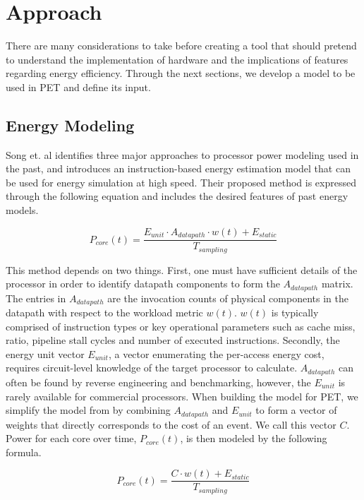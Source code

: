 \section{Approach}

There are many considerations to take before creating a tool that should pretend
to understand the implementation of hardware and the implications of features
regarding energy efficiency. Through the next sections, we develop a model to be
used in PET and define its input.


\subsection{Energy Modeling}

Song et. al \cite{song2012instruction} identifies three major approaches to
processor power modeling used in the past, and introduces an instruction-based
energy estimation model that can be used for energy simulation at high speed.
Their proposed method is expressed through the following equation and includes
the desired features of past energy models.

\begin{equation}
    P_{core}(t) = \frac{E_{unit} \cdot A_{datapath} \cdot w(t) +
    E_{static}}{T_{sampling}}
\end{equation}

This method depends on two things. First, one must have sufficient details of
the processor in order to identify datapath components to form the
$A_{datapath}$ matrix. The entries in $A_{datapath}$ are the invocation counts
of physical components in the datapath with respect to the workload metric
$w(t)$. $w(t)$ is typically comprised of instruction types or key operational
parameters such as cache miss, ratio, pipeline stall cycles and number of
executed instructions. Secondly, the energy unit vector $E_{unit}$, a vector
enumerating the per-access energy cost, requires circuit-level knowledge of the
target processor to calculate. $A_{datapath}$ can often be found by reverse
engineering and benchmarking, however, the $E_{unit}$ is rarely available for
commercial processors. When building the model for PET, we simplify the model
from \cite{song2012instruction} by combining $A_{datapath}$ and $E_{unit}$ to
form a vector of weights that directly corresponds to the cost of an event. We
call this vector $C$. Power for each core over time, $P_{core}(t)$, is then
modeled by the following formula.

\begin{equation}
    P_{core}(t) = \frac{C \cdot w(t) + E_{static}}{T_{sampling}}
\end{equation}

